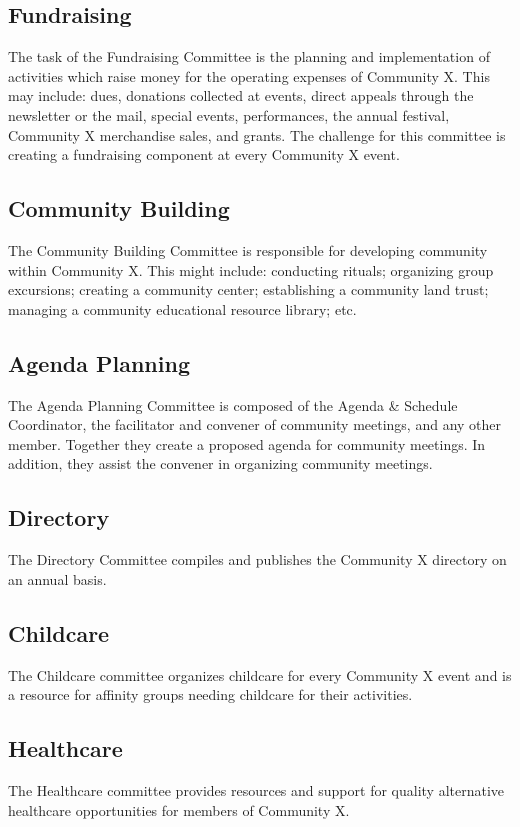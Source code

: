 \subsection*{Fundraising}
The task of the Fundraising Committee is the planning and implementation of activities which raise money for the operating expenses of Community X. This may include: dues, donations collected at events, direct appeals through the newsletter or the mail, special events, performances, the annual festival, Community X merchandise sales, and grants. The challenge for this committee is creating a fundraising component at every Community X event.


\subsection*{Community Building}
The Community Building Committee is responsible for developing community within Community X. This might include: conducting rituals; organizing group excursions; creating a community center; establishing a community land trust; managing a community educational resource library; etc.


\subsection*{Agenda Planning}
The Agenda Planning Committee is composed of the Agenda \& Schedule Coordinator, the facilitator and convener of community meetings, and any other member. Together they create a proposed agenda for community meetings. In addition, they assist the convener in organizing community meetings.


\subsection*{Directory}
The Directory Committee compiles and publishes the Community X directory on an annual basis.


\subsection*{Childcare}
The Childcare committee organizes childcare for every Community X event and is a resource for affinity groups needing childcare for their activities.


\subsection*{Healthcare}
The Healthcare committee provides resources and support for quality alternative healthcare opportunities for members of Community X.


